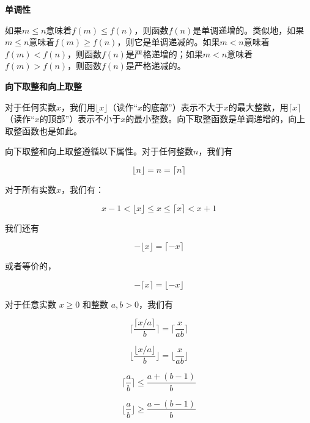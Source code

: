 \documentclass[lang=cn,newtx,10pt,scheme=chinese]{elegantbook}
\begin{document}
\textbf{单调性}

如果$m\leq n$意味着$f(m)\leq f(n)$，则函数$f(n)$是单调递增的。类似地，如果$m\leq n$意味着$f(m)\geq f(n)$，则它是单调递减的。如果$m<n$意味着$f(m)<f(n)$，则函数$f(n)$是严格递增的；如果$m<n$意味着$f(m)>f(n)$，则函数$f(n)$是严格递减的。

\textbf{向下取整和向上取整}

对于任何实数$x$，我们用$\lfloor x\rfloor$（读作“$x$的底部”）表示不大于$x$的最大整数，用$\lceil x\rceil$（读作“$x$的顶部”）表示不小于$x$的最小整数。向下取整函数是单调递增的，向上取整函数也是如此。

向下取整和向上取整遵循以下属性。对于任何整数$n$，我们有

\begin{equation}\label{eq:3.1}
\lfloor n\rfloor=n=\lceil n\rceil
\end{equation}

对于所有实数$x$，我们有：

\begin{equation}\label{eq:3.2}
x-1<\lfloor x\rfloor \leq x \leq\lceil x\rceil<x+1
\end{equation}

我们还有

\begin{equation}\label{eq:3.3}
-\lfloor x\rfloor=\lceil-x\rceil
\end{equation}

或者等价的，

\begin{equation}\label{eq:3.4}
-\lceil x\rceil=\lfloor-x\rfloor
\end{equation}

对于任意实数 $x \geq 0$ 和整数 $a, b>0$，我们有

\begin{equation}\label{eq:3.5}
\lceil\frac{\lceil x / a\rceil}{b}\rceil=\lceil\frac{x}{a b}\rceil
\end{equation}

\begin{equation}\label{eq:3.6}
\lfloor\frac{\lfloor x / a\rfloor}{b}\rfloor=\lfloor\frac{x}{a b}\rfloor
\end{equation}

\begin{equation}\label{eq:3.7}
\lceil\frac{a}{b}\rceil \leq \frac{a+(b-1)}{b}
\end{equation}

\begin{equation}\label{eq:3.8}
\lfloor\frac{a}{b}\rfloor \geq \frac{a-(b-1)}{b}
\end{equation}
\end{document}
